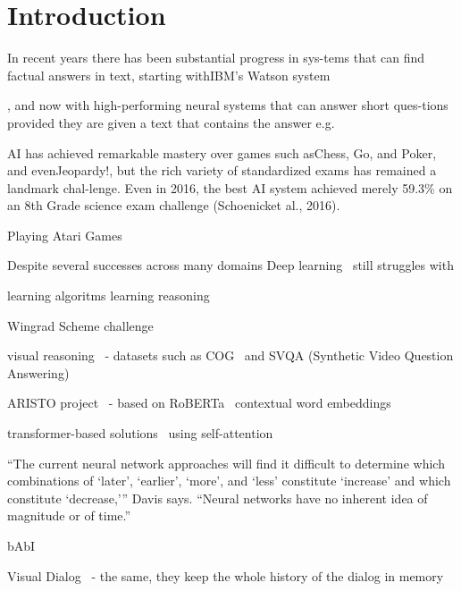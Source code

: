 \section{Introduction}

In recent years there has been substantial progress in sys-tems  that  can  find  factual  answers  in  text,  starting  withIBM’s Watson system~\cite{ferrucci2010building}

, and now with high-performing neural systems that can answer short ques-tions provided they are given a text that contains the answer e.g.~\cite{wang2018glue}


AI  has  achieved  remarkable  mastery  over  games  such  asChess, Go, and Poker, and evenJeopardy!, but the rich variety of standardized exams has remained a landmark chal-lenge.   Even  in  2016,  the  best  AI  system  achieved  merely 59.3\% on an 8th Grade science exam challenge (Schoenicket al., 2016).




Playing Atari Games~\cite{mnih2015human}


Despite several successes across many domains Deep learning~\cite{lecun2015deep} still struggles with

learning algoritms
learning reasoning~\cite{graves2016hybrid}


Wingrad Scheme challenge~\cite{levesque2012winograd}

visual reasoning~\cite{mogadala2019trends} - datasets such as COG~\cite{yang2018dataset} and 
SVQA (Synthetic Video Question Answering)~\cite{song2018explore}


ARISTO project~\cite{clark2019f} - based on RoBERTa~\cite{liu2019roberta} contextual word embeddings

transformer-based solutions~\cite{vaswani2017attention} using self-attention


“The current neural network approaches will find it difficult to determine which combinations of ‘later’, ‘earlier’, ‘more’, and ‘less’ constitute ‘increase’ and which constitute ‘decrease,'” Davis says. “Neural networks have no inherent idea of magnitude or of time.”
~\cite{davis2016write}

bAbI~\cite{weston2015towards}

Visual Dialog~\cite{das2017visual} - the same, they keep the whole history of the dialog in memory

